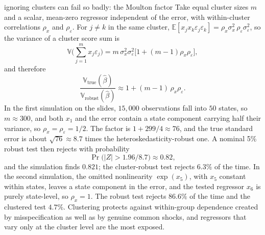 \documentclass[11pt,a4paper]{article}
\newcommand{\E}{\mathbb{E}}
\newcommand{\V}{\mathbb{V}}
\newcommand{\bh}{\hat\beta}
\begin{document}
\begin{whybox}{ignoring clusters can fail so badly: the Moulton factor}
Take equal cluster sizes $m$ and a scalar, mean-zero regressor independent of the error, with within-cluster correlations $\rho_x$ and $\rho_\varepsilon$. For $j\neq k$ in the same cluster, $\E[x_jx_k\varepsilon_j\varepsilon_k]=\rho_x\sigma_x^2\,\rho_\varepsilon\sigma_\varepsilon^2$, so the variance of a cluster score sum is
\[
\V\Big(\sum_{j=1}^mx_j\varepsilon_j\Big)=m\,\sigma_x^2\sigma_\varepsilon^2\big[1+(m-1)\rho_x\rho_\varepsilon\big],
\]
and therefore
\[
\frac{\V_{\text{true}}(\bh)}{\V_{\text{robust}}(\bh)}\approx1+(m-1)\,\rho_x\rho_\varepsilon .
\]
In the first simulation on the slides, $15{,}000$ observations fall into $50$ states, so $m\approx300$, and both $x_1$ and the error contain a state component carrying half their variance, so $\rho_x=\rho_\varepsilon=1/2$. The factor is $1+299/4\approx76$, and the true standard error is about $\sqrt{76}\approx8.7$ times the heteroskedasticity-robust one. A nominal 5\% robust test then rejects with probability
\[
\Pr\big(|Z|>1.96/8.7\big)\approx0.82,
\]
and the simulation finds $0.821$; the cluster-robust test rejects $6.3\%$ of the time. In the second simulation, the omitted nonlinearity $\exp(x_5)$, with $x_5$ constant within states, leaves a state component in the error, and the tested regressor $x_6$ is purely state-level, so $\rho_x=1$. The robust test rejects $86.6\%$ of the time and the clustered test $4.7\%$. Clustering protects against within-group dependence created by misspecification as well as by genuine common shocks, and regressors that vary only at the cluster level are the most exposed.
\end{whybox}
\end{document}
